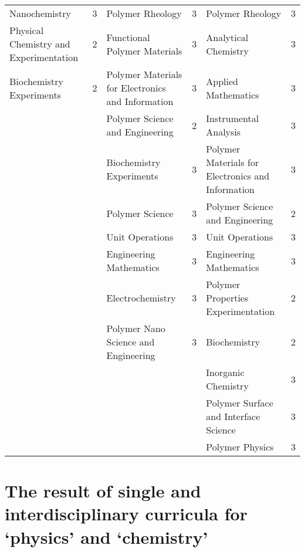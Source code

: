 \documentclass{bmcart}
\begin{document}
\begin{landscape}
\begin{longtable}{p{3.5cm}|p{1cm}|p{7cm}|p{1cm}|p{7cm}|p{1cm}}
\scriptsize Nanochemistry & \scriptsize 3 & \scriptsize Polymer Rheology & \scriptsize 3 & \scriptsize Polymer Rheology & \scriptsize 3 \\
\scriptsize Physical Chemistry and Experimentation & \scriptsize 2 & \scriptsize Functional Polymer Materials & \scriptsize 3 & \scriptsize Analytical Chemistry & \scriptsize 3 \\
\scriptsize Biochemistry Experiments & \scriptsize 2 & \scriptsize Polymer Materials for Electronics and Information & \scriptsize 3 & \scriptsize Applied Mathematics & \scriptsize 3 \\
\scriptsize & \scriptsize & \scriptsize Polymer Science and Engineering & \scriptsize 2 & \scriptsize Instrumental Analysis & \scriptsize 3 \\
\scriptsize & \scriptsize & \scriptsize Biochemistry Experiments & \scriptsize 3 & \scriptsize Polymer Materials for Electronics and Information & \scriptsize 3 \\
\scriptsize & \scriptsize & \scriptsize Polymer Science & \scriptsize 3 & \scriptsize Polymer Science and Engineering & \scriptsize 2 \\
\scriptsize & \scriptsize & \scriptsize Unit Operations & \scriptsize 3 & \scriptsize Unit Operations & \scriptsize 3 \\
\scriptsize & \scriptsize & \scriptsize Engineering Mathematics & \scriptsize 3 & \scriptsize Engineering Mathematics & \scriptsize 3 \\
\scriptsize & \scriptsize & \scriptsize Electrochemistry & \scriptsize 3 & \scriptsize Polymer Properties Experimentation & \scriptsize 2 \\
\scriptsize & \scriptsize & \scriptsize Polymer Nano Science and Engineering & \scriptsize 3 & \scriptsize Biochemistry & \scriptsize 2 \\
\scriptsize & \scriptsize & \scriptsize & \scriptsize & \scriptsize Inorganic Chemistry & \scriptsize 3 \\
\scriptsize & \scriptsize & \scriptsize & \scriptsize & \scriptsize Polymer Surface and Interface Science & \scriptsize 3 \\
\scriptsize & \scriptsize & \scriptsize & \scriptsize & \scriptsize Polymer Physics & \scriptsize 3 \\


\end{longtable}

\newpage
\section{The result of single and interdisciplinary curricula for `physics' and `chemistry'}
\tiny


\end{landscape}
\end{document}
